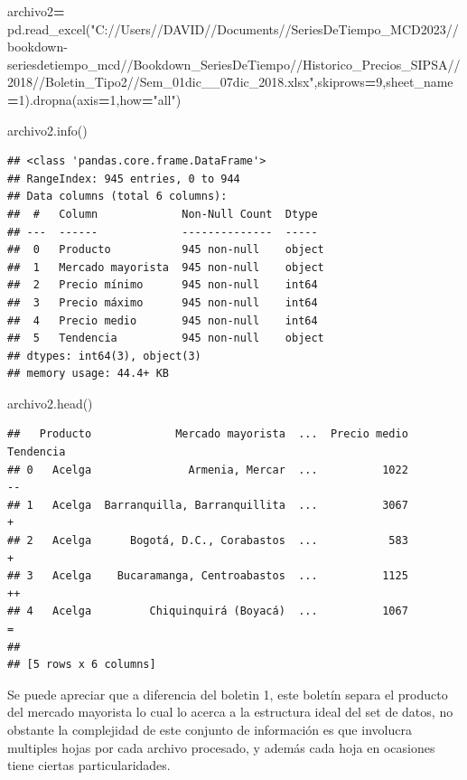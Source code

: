 \documentclass[
]{book}
\newenvironment{Shaded}{\begin{snugshade}}{\end{snugshade}}
\newcommand{\DecValTok}[1]{\textcolor[rgb]{0.00,0.00,0.81}{#1}}
\newcommand{\NormalTok}[1]{#1}
\newcommand{\OperatorTok}[1]{\textcolor[rgb]{0.81,0.36,0.00}{\textbf{#1}}}
\newcommand{\StringTok}[1]{\textcolor[rgb]{0.31,0.60,0.02}{#1}}
\begin{document}
\begin{Shaded}
\begin{Highlighting}[]
\NormalTok{archivo2}\OperatorTok{=}\NormalTok{ pd.read\_excel(}\StringTok{"C://Users//DAVID//Documents//SeriesDeTiempo\_MCD2023//bookdown{-}seriesdetiempo\_mcd//Bookdown\_SeriesDeTiempo//Historico\_Precios\_SIPSA//2018//Boletin\_Tipo2//Sem\_01dic\_\_07dic\_2018.xlsx"}\NormalTok{,skiprows}\OperatorTok{=}\DecValTok{9}\NormalTok{,sheet\_name}\OperatorTok{=}\DecValTok{1}\NormalTok{).dropna(axis}\OperatorTok{=}\DecValTok{1}\NormalTok{,how}\OperatorTok{=}\StringTok{"all"}\NormalTok{)}

\NormalTok{archivo2.info()}
\end{Highlighting}
\end{Shaded}

\begin{verbatim}
## <class 'pandas.core.frame.DataFrame'>
## RangeIndex: 945 entries, 0 to 944
## Data columns (total 6 columns):
##  #   Column             Non-Null Count  Dtype 
## ---  ------             --------------  ----- 
##  0   Producto           945 non-null    object
##  1   Mercado mayorista  945 non-null    object
##  2   Precio mínimo      945 non-null    int64 
##  3   Precio máximo      945 non-null    int64 
##  4   Precio medio       945 non-null    int64 
##  5   Tendencia          945 non-null    object
## dtypes: int64(3), object(3)
## memory usage: 44.4+ KB
\end{verbatim}

\begin{Shaded}
\begin{Highlighting}[]
\NormalTok{archivo2.head()}
\end{Highlighting}
\end{Shaded}

\begin{verbatim}
##   Producto             Mercado mayorista  ...  Precio medio  Tendencia
## 0   Acelga               Armenia, Mercar  ...          1022         --
## 1   Acelga  Barranquilla, Barranquillita  ...          3067          +
## 2   Acelga      Bogotá, D.C., Corabastos  ...           583          +
## 3   Acelga    Bucaramanga, Centroabastos  ...          1125         ++
## 4   Acelga         Chiquinquirá (Boyacá)  ...          1067          =
## 
## [5 rows x 6 columns]
\end{verbatim}

Se puede apreciar que a diferencia del boletin 1, este boletín separa el producto del mercado mayorista lo cual lo acerca a la estructura ideal del set de datos, no obstante la complejidad de este conjunto de información es que involucra multiples hojas por cada archivo procesado, y además cada hoja en ocasiones tiene ciertas particularidades.
\end{document}
